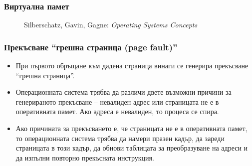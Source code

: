 \documentclass[ignorenonframetext, hyperref=unicode]{beamer}
\begin{document}
\begin{frame}
\frametitle{Виртуална памет}
\begin{figure}[h]
\center
{}
\caption{Silberschatz, Gavin, Gagne: {\em Operating Systems Concepts}}
\end{figure}
\end{frame}


\begin{frame}
\frametitle{Прекъсване ``грешна страница (page fault)''}
\begin{itemize}
  \item При първото обръщане към дадена страница винаги се генерира 
  прекъсване ``грешна страница''.
  \item Операционната система трябва да различи двете възможни причини за
  генерираното прекъсване -- невалиден адрес или страницата не е в оперативната
  памет. Ако адреса е невалиден, то процеса се спира. 
  \item Ако причината за прекъсването е, че страницата не е в оперативната
  памет, то операционната система трябва да намери празен кадър, да зареди
  страницата в този кадър, да обнови таблицата за преобразуване на адреси и да
  изпълни повторно прекъсната инструкция.
\end{itemize}
\end{frame}
\end{document}
